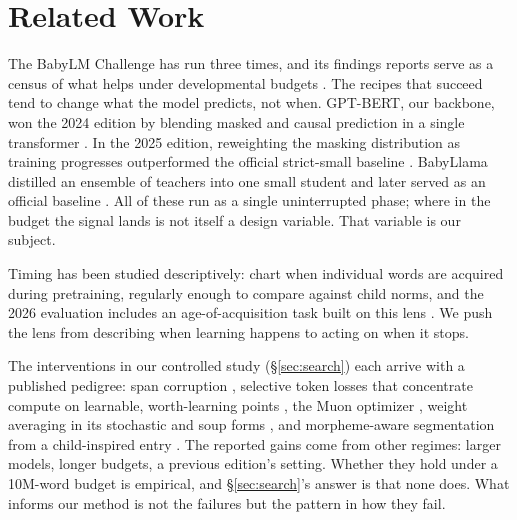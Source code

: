 \section{Related Work}
\label{sec:related}

The BabyLM Challenge has run three times, and its findings reports serve
as a census of what helps under developmental budgets
\citep{warstadt2023findings,hu2024findings,charpentier2025findings}. The
recipes that succeed tend to change what the model predicts, not
when. GPT-BERT, our backbone, won the 2024 edition by blending masked and
causal prediction in a single transformer \citep{charpentier2024gptbert}.
In the 2025 edition, reweighting the masking distribution as training
progresses outperformed the official strict-small baseline
\citep{edman2025mask}. BabyLlama distilled an ensemble
of teachers into one small student and later served as an official
baseline \citep{timiryasov2023babyllama,hu2024findings}. All of these run
as a single uninterrupted phase; where in the budget the signal lands is
not itself a design variable. That variable is our subject.

Timing has been studied descriptively: \citet{chang2022word} chart when
individual words are acquired during pretraining, regularly enough to
compare against child norms, and the 2026 evaluation includes an
age-of-acquisition task built on this lens \citep{choshen2026babylm}. We
push the lens from describing when learning happens to acting on when it
stops.

The interventions in our controlled study (\S\ref{sec:search}) each arrive
with a published pedigree: span corruption \citep{joshi2020spanbert},
selective token losses that concentrate compute on learnable,
worth-learning points \citep{mindermann2022prioritized,lin2024rho}, the
Muon optimizer \citep{jordan2024muon}, weight averaging in its stochastic
and soup forms \citep{izmailov2018swa,wortsman2022soups}, and
morpheme-aware segmentation from a child-inspired entry
\citep{bolucu2025morpheme}. The reported gains come from other regimes:
larger models, longer budgets, a previous edition's setting. Whether
they hold under a 10M-word budget is empirical, and \S\ref{sec:search}'s
answer is that none does. What informs our method is not the failures but
the pattern in how they fail.

